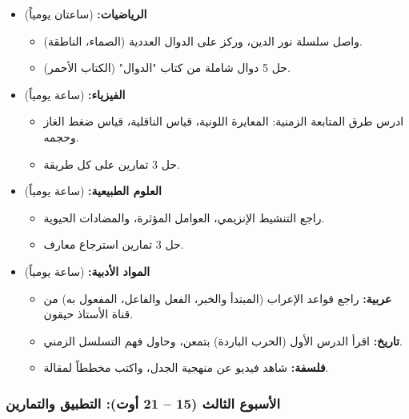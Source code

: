\documentclass[12pt,a4paper]{book}
\begin{document}
	\begin{itemize}
		\item \textbf{الرياضيات:} (ساعتان يومياً)
		\begin{itemize}
			\item واصل سلسلة نور الدين، وركز على الدوال العددية (الصماء، الناطقة).
			\item حل 5 دوال شاملة من كتاب "الدوال" (الكتاب الأحمر).
		\end{itemize}
		\item \textbf{الفيزياء:} (ساعة يومياً)
		\begin{itemize}
			\item ادرس طرق المتابعة الزمنية: المعايرة اللونية، قياس الناقلية، قياس ضغط الغاز وحجمه.
			\item حل 3 تمارين على كل طريقة.
		\end{itemize}
		\item \textbf{العلوم الطبيعية:} (ساعة يومياً)
		\begin{itemize}
			\item راجع التنشيط الإنزيمي، العوامل المؤثرة، والمضادات الحيوية.
			\item حل 3 تمارين استرجاع معارف.
		\end{itemize}
		\item \textbf{المواد الأدبية:} (ساعة يومياً)
		\begin{itemize}
			\item \textbf{عربية:} راجع قواعد الإعراب (المبتدأ والخبر، الفعل والفاعل، المفعول به) من قناة الأستاذ حيقون.
			\item \textbf{تاريخ:} اقرأ الدرس الأول (الحرب الباردة) بتمعن، وحاول فهم التسلسل الزمني.
			\item \textbf{فلسفة:} شاهد فيديو عن منهجية الجدل، واكتب مخططاً لمقالة.
		\end{itemize}
	\end{itemize}
	
	\subsubsection{الأسبوع الثالث (15 – 21 أوت): التطبيق والتمارين}
	
\end{document}
